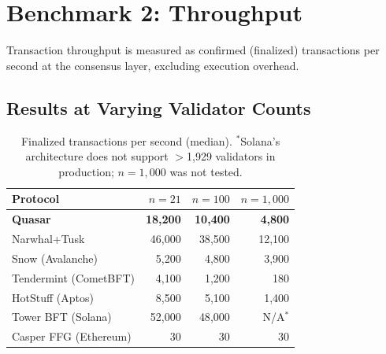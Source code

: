 \section{Benchmark 2: Throughput}

\label{sec:throughput}

Transaction throughput is measured as confirmed (finalized) transactions per second at
the consensus layer, excluding execution overhead.

\subsection{Results at Varying Validator Counts}

\begin{table}[h]
\centering
\begin{tabular}{@{}lrrr@{}}
\toprule
\textbf{Protocol} & \textbf{$n=21$} & \textbf{$n=100$} & \textbf{$n=1{,}000$} \\
\midrule
\textbf{Quasar}        & \textbf{18{,}200} & \textbf{10{,}400} & \textbf{4{,}800} \\
Narwhal+Tusk           & 46{,}000          & 38{,}500          & 12{,}100 \\
Snow (Avalanche)       & 5{,}200           & 4{,}800           & 3{,}900 \\
Tendermint (CometBFT)  & 4{,}100           & 1{,}200           & 180 \\
HotStuff (Aptos)       & 8{,}500           & 5{,}100           & 1{,}400 \\
Tower BFT (Solana)     & 52{,}000          & 48{,}000          & N/A$^*$ \\
Casper FFG (Ethereum)  & 30                & 30                & 30 \\
\bottomrule
\end{tabular}
\caption{Finalized transactions per second (median). $^*$Solana's architecture does not support $>$1{,}929 validators in production; $n=1{,}000$ was not tested.}
\label{tab:throughput}
\end{table}

